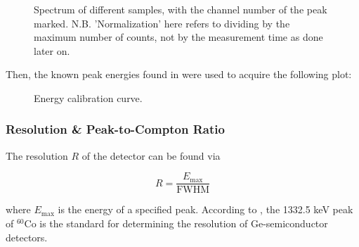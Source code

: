 \documentclass{article}
\begin{document}
\begin{figure}[h!]
	\centering
	\begin{subfigure}{0.45\textwidth}
		\centering
		\scalebox{0.5}{}
		\caption{}
		\label{fig:1}
	\end{subfigure}
	\begin{subfigure}{0.45\textwidth}
		\centering
		\scalebox{0.5}{}
		\caption{}
		\label{fig:2}
	\end{subfigure}
	\begin{subfigure}{0.45\textwidth}
		\centering
		\scalebox{0.5}{}
		\caption{}
		\label{fig:3}
	\end{subfigure}
	\begin{subfigure}{0.45\textwidth}
		\centering
		\scalebox{0.5}{}
		\caption{}
		\label{fig:4}
	\end{subfigure}
	\caption{Spectrum of different samples, with the channel number of the peak marked. N.B. 'Normalization' here refers to dividing by the maximum number of counts, not by the measurement time as done later on.}
	\label{fig:task1spectra}
\end{figure}

Then, the known peak energies found in \cite{plotzki_2024_highresolution} were used to acquire the following plot:

\begin{figure}[h!]
	\centering
	\scalebox{1}{}
	\caption{Energy calibration curve.}
	\label{fig:EnergyCalibration}
\end{figure}

\pagebreak{}

\subsubsection{Resolution \& Peak-to-Compton Ratio}

The resolution $R$ of the detector can be found via

\begin{equation}
	R = \frac{E_{\text{max}}}{\text{FWHM}}
\end{equation}

where $E_{\text{max}}$ is the energy of a specified peak. According to \cite{plotzki_2024_highresolution}, the 1332.5 keV peak of $^{60}$Co is the standard for determining the resolution of Ge-semiconductor detectors. 
\end{document}
